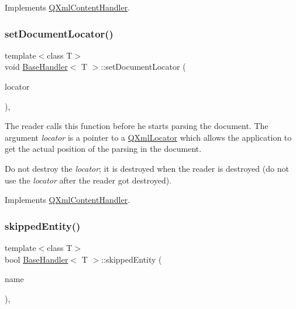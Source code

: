 Implements \mbox{\hyperlink{class_q_xml_content_handler_af0abc06326798a6e522f91e6174b7b9e}{Q\+Xml\+Content\+Handler}}.

\mbox{\label{class_base_handler_abedc453093f90a5436a0bcb0c78b4aca}} 
\subsubsection{\texorpdfstring{setDocumentLocator()}{setDocumentLocator()}}
{\footnotesize\ttfamily template$<$class T$>$ \\
void \mbox{\hyperlink{class_base_handler}{Base\+Handler}}$<$ T $>$\+::set\+Document\+Locator (\begin{DoxyParamCaption}\item[{\mbox{\hyperlink{class_q_xml_locator}{Q\+Xml\+Locator}} $\ast$}]{locator }\end{DoxyParamCaption})\hspace{0.3cm}{\ttfamily [inline]}, {\ttfamily [virtual]}}

The reader calls this function before he starts parsing the document. The argument {\itshape locator} is a pointer to a \mbox{\hyperlink{class_q_xml_locator}{Q\+Xml\+Locator}} which allows the application to get the actual position of the parsing in the document.

Do not destroy the {\itshape locator}; it is destroyed when the reader is destroyed (do not use the {\itshape locator} after the reader got destroyed). 

Implements \mbox{\hyperlink{class_q_xml_content_handler_a89863bd9a6372d3d73086aa99107bca7}{Q\+Xml\+Content\+Handler}}.

\mbox{\label{class_base_handler_a2191a9b5ac9ebddc8c91dd56fff8e684}} 
\subsubsection{\texorpdfstring{skippedEntity()}{skippedEntity()}}
{\footnotesize\ttfamily template$<$class T$>$ \\
bool \mbox{\hyperlink{class_base_handler}{Base\+Handler}}$<$ T $>$\+::skipped\+Entity (\begin{DoxyParamCaption}\item[{const \mbox{\hyperlink{class_q_string}{Q\+String}} \&}]{name }\end{DoxyParamCaption})\hspace{0.3cm}{\ttfamily [inline]}, {\ttfamily [virtual]}}

